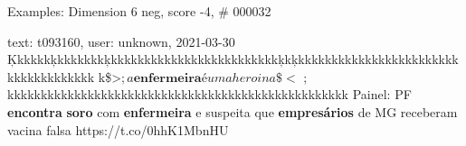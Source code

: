 \begin{frame}{Examples: Dimension 6 neg, score -4, \# 000032}
\footnotesize
\begin{alertblock}{text: t093160, user: unknown, 2021-03-30}
Ķkkkkkķkkkkkkkķkkkkkkkkkkkkkkkkkkkkkkkkkķkķkkkkkkkkkkkkkkkkkkkkkkkkkkkkkkkkkkkkk
k\$>$ ; a \textbf{enfermeira} é uma heroina\$<$ ; 
kkkkkkkkkkkkkkkkkkkkkkkkkkkkkkkkkkkkkkkkkkkkkkkkkkk Painel: PF 
\textbf{encontra} \textbf{soro} com \textbf{enfermeira} e suspeita que 
\textbf{empresários} de MG receberam vacina falsa https://t.co/0hhK1MbnHU 
\end{alertblock}
\end{frame}
